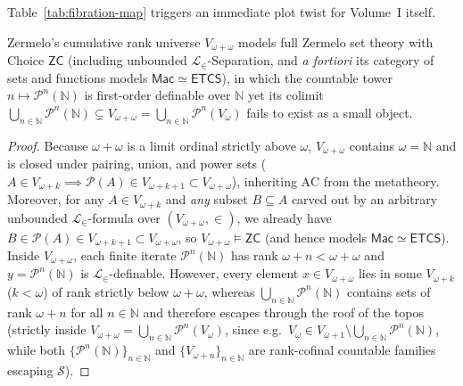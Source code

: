 Table~\ref{tab:fibration-map} triggers an immediate plot twist for Volume~I itself.

\begin{proposition}\label{prop:etcs-colimit-escape}%
%
Zermelo's cumulative rank universe $V_{\omega+\omega}$ models full Zermelo set theory with Choice $\mathsf{ZC}$ (including unbounded $\mathcal{L}_\in$-Separation, and \emph{a fortiori} its category of sets and functions models $\mathsf{Mac} \simeq \mathsf{ETCS}$), in which the countable tower $n \mapsto \mathcal{P}^n(\mathbb{N})$ is first-order definable over $\mathbb{N}$ yet its colimit $\bigcup_{n \in \mathbb{N}} \mathcal{P}^n(\mathbb{N}) \subsetneq V_{\omega+\omega} = \bigcup_{n \in \mathbb{N}} \mathcal{P}^n(V_\omega)$ fails to exist as a small object.
\end{proposition}

\begin{proof}
Because $\omega + \omega$ is a limit ordinal strictly above $\omega$, $V_{\omega+\omega}$ contains $\omega = \mathbb{N}$ and is closed under pairing, union, and power sets ($A \in V_{\omega+k} \implies \mathcal{P}(A) \in V_{\omega+k+1} \subset V_{\omega+\omega}$), inheriting $\mathrm{AC}$ from the metatheory. Moreover, for any $A \in V_{\omega+k}$ and \emph{any} subset $B \subseteq A$ carved out by an arbitrary unbounded $\mathcal{L}_\in$-formula over $(V_{\omega+\omega}, \in)$, we already have $B \in \mathcal{P}(A) \in V_{\omega+k+1} \subset V_{\omega+\omega}$, so $V_{\omega+\omega} \models \mathsf{ZC}$ (and hence models $\mathsf{Mac} \simeq \mathsf{ETCS}$). Inside $V_{\omega+\omega}$, each finite iterate $\mathcal{P}^n(\mathbb{N})$ has rank $\omega + n < \omega + \omega$ and $y = \mathcal{P}^n(\mathbb{N})$ is $\mathcal{L}_\in$-definable. However, every element $x \in V_{\omega+\omega}$ lies in some $V_{\omega+k}$ ($k < \omega$) of rank strictly below $\omega + \omega$, whereas $\bigcup_{n \in \mathbb{N}} \mathcal{P}^n(\mathbb{N})$ contains sets of rank $\omega + n$ for all $n \in \mathbb{N}$ and therefore escapes through the roof of the topos (strictly inside $V_{\omega+\omega} = \bigcup_{n \in \mathbb{N}} \mathcal{P}^n(V_\omega)$, since e.g.\ $V_\omega \in V_{\omega+1} \setminus \bigcup_{n \in \mathbb{N}} \mathcal{P}^n(\mathbb{N})$, while both $\{\mathcal{P}^n(\mathbb{N})\}_{n \in \mathbb{N}}$ and $\{V_{\omega+n}\}_{n \in \mathbb{N}}$ are rank-cofinal countable families escaping $\mathcal{S}$).
\end{proof}

